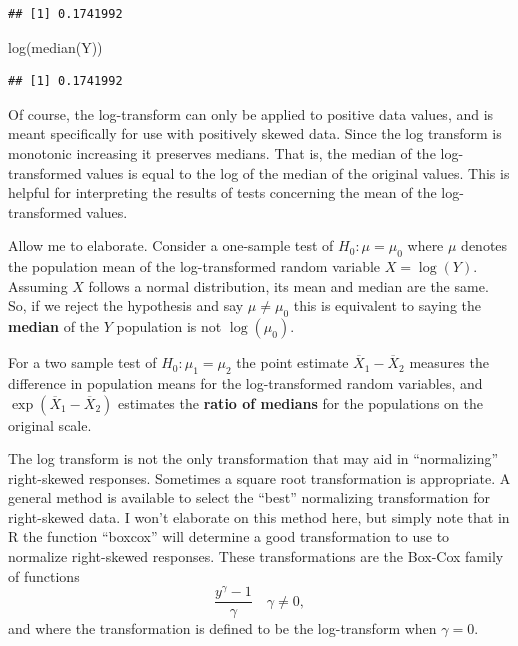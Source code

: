 \documentclass[
]{book}
\newenvironment{Shaded}{\begin{snugshade}}{\end{snugshade}}
\newcommand{\FunctionTok}[1]{\textcolor[rgb]{0.00,0.00,0.00}{#1}}
\newcommand{\NormalTok}[1]{#1}
\begin{document}
\begin{verbatim}
## [1] 0.1741992
\end{verbatim}

\begin{Shaded}
\begin{Highlighting}[]
\FunctionTok{log}\NormalTok{(}\FunctionTok{median}\NormalTok{(Y))}
\end{Highlighting}
\end{Shaded}

\begin{verbatim}
## [1] 0.1741992
\end{verbatim}

Of course, the log-transform can only be applied to positive data values, and is meant specifically for use with positively skewed data. Since the log transform is monotonic increasing it preserves medians. That is, the median of the log-transformed values is equal to the log of the median of the original values. This is helpful for interpreting the results of tests concerning the mean of the log-transformed values.

Allow me to elaborate. Consider a one-sample test of \(H_0:\mu = \mu_0\) where \(\mu\) denotes the population mean of the log-transformed random variable \(X = \log(Y)\). Assuming \(X\) follows a normal distribution, its mean and median are the same. So, if we reject the hypothesis and say \(\mu \ne \mu_0\) this is equivalent to saying the \textbf{median} of the \(Y\) population is not \(\log(\mu_0)\).

For a two sample test of \(H_0:\mu_1 = \mu_2\) the point estimate \(\overline X_1 - \overline X_2\) measures the difference in population means for the log-transformed random variables, and \(\exp(\overline X_1 - \overline X_2)\) estimates the \textbf{ratio of medians} for the populations on the original scale.

The log transform is not the only transformation that may aid in ``normalizing'' right-skewed responses. Sometimes a square root transformation is appropriate. A general method is available to select the ``best'' normalizing transformation for right-skewed data. I won't elaborate on this method here, but simply note that in R the function ``boxcox'' will determine a good transformation to use to normalize right-skewed responses. These transformations are the Box-Cox family of functions
\[\frac{y^\gamma - 1}{\gamma}\quad \gamma \ne 0, \]
and where the transformation is defined to be the log-transform when \(\gamma = 0\).
\end{document}
